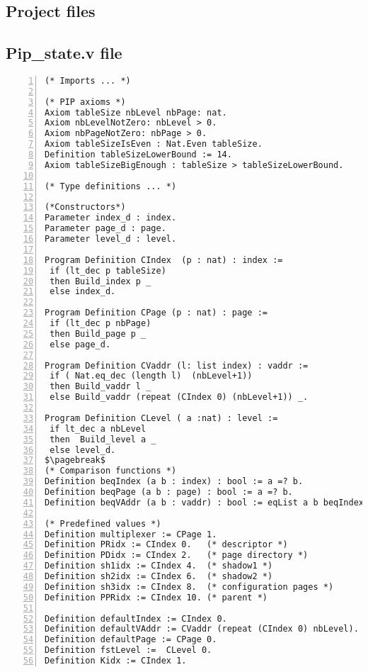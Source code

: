 \begin{appendices}

\chapter{Project files}

\section{Pip\_state.v file} \label{stateFile}
\begin{lstlisting}[xleftmargin=-.1\textwidth,
xrightmargin=-.1\textwidth,
mathescape=true,numbers=left]
(* Imports ... *)

(* PIP axioms *)
Axiom tableSize nbLevel nbPage: nat.
Axiom nbLevelNotZero: nbLevel > 0.
Axiom nbPageNotZero: nbPage > 0.
Axiom tableSizeIsEven : Nat.Even tableSize.
Definition tableSizeLowerBound := 14.  
Axiom tableSizeBigEnough : tableSize > tableSizeLowerBound. 

(* Type definitions ... *)

(*Constructors*)
Parameter index_d : index.
Parameter page_d : page.
Parameter level_d : level.

Program Definition CIndex  (p : nat) : index := 
 if (lt_dec p tableSize) 
 then Build_index p _ 
 else index_d.

Program Definition CPage (p : nat) : page := 
 if (lt_dec p nbPage) 
 then Build_page p _ 
 else page_d.

Program Definition CVaddr (l: list index) : vaddr := 
 if ( Nat.eq_dec (length l)  (nbLevel+1))  
 then Build_vaddr l _
 else Build_vaddr (repeat (CIndex 0) (nbLevel+1)) _.

Program Definition CLevel ( a :nat) : level := 
 if lt_dec a nbLevel 
 then  Build_level a _ 
 else level_d.
$\pagebreak$
(* Comparison functions *)
Definition beqIndex (a b : index) : bool := a =? b.
Definition beqPage (a b : page) : bool := a =? b.
Definition beqVAddr (a b : vaddr) : bool := eqList a b beqIndex.

(* Predefined values *)
Definition multiplexer := CPage 1.
Definition PRidx := CIndex 0.   (* descriptor *)
Definition PDidx := CIndex 2.   (* page directory *)
Definition sh1idx := CIndex 4.  (* shadow1 *) 
Definition sh2idx := CIndex 6.  (* shadow2 *)
Definition sh3idx := CIndex 8.  (* configuration pages *)
Definition PPRidx := CIndex 10. (* parent *)

Definition defaultIndex := CIndex 0.
Definition defaultVAddr := CVaddr (repeat (CIndex 0) nbLevel).
Definition defaultPage := CPage 0.
Definition fstLevel :=  CLevel 0.
Definition Kidx := CIndex 1.
\end{lstlisting}
\pagebreak

\end{appendices}
